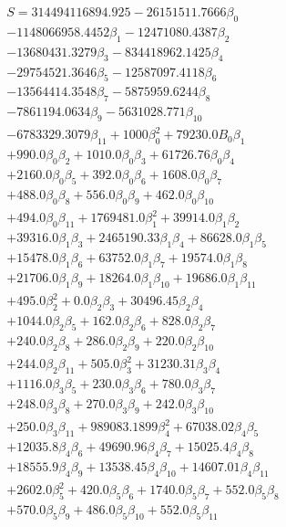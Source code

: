 \documentclass[letterpaper, 10 pt, conference]{ieeeconf}
\begin{document}
\begin{equation} \label{eq7}
\begin{split}
S = 314494116894.925-26151511.7666\beta_0\\
-1148066958.4452\beta_1-12471080.4387\beta_2\\
-13680431.3279\beta_3-834418962.1425\beta_4\\
-29754521.3646\beta_5-12587097.4118\beta_6\\
-13564414.3548\beta_7-5875959.6244\beta_8\\
-7861194.0634\beta_9-5631028.771\beta_{10}\\
-6783329.3079\beta_{11}+1000\beta_0^2+79230.0B_0\beta_1\\
+990.0\beta_0\beta_2+1010.0\beta_0\beta_3+61726.76\beta_0\beta_4\\
+2160.0\beta_0\beta_5+392.0\beta_0\beta_6+1608.0\beta_0\beta_7\\
+488.0\beta_0\beta_8+556.0\beta_0\beta_9+462.0\beta_0\beta_{10}\\
+494.0\beta_0\beta_{11}+1769481.0\beta_1^2+39914.0\beta_1\beta_2\\
+39316.0\beta_1\beta_3+2465190.33\beta_1\beta_4+86628.0\beta_1\beta_5\\
+15478.0\beta_1\beta_6+63752.0\beta_1\beta_7+19574.0\beta_1\beta_8\\
+21706.0\beta_1\beta_9+18264.0\beta_1\beta_{10}+19686.0\beta_1\beta_{11}\\
+495.0\beta_2^2+0.0\beta_2\beta_3+30496.45\beta_2\beta_4\\
+1044.0\beta_2\beta_5+162.0\beta_2\beta_6+828.0\beta_2\beta_7\\
+240.0\beta_2\beta_8+286.0\beta_2\beta_9+220.0\beta_2\beta_{10}\\
+244.0\beta_2\beta_{11}+505.0\beta_3^2+31230.31\beta_3\beta_4\\
+1116.0\beta_3\beta_5+230.0\beta_3\beta_6+780.0\beta_3\beta_7\\
+248.0\beta_3\beta_8+270.0\beta_3\beta_9+242.0\beta_3\beta_{10}\\
+250.0\beta_3\beta_{11}+989083.1899\beta_4^2+67038.02\beta_4\beta_5\\
+12035.8\beta_4\beta_6+49690.96\beta_4\beta_7+15025.4\beta_4\beta_8\\
+18555.9\beta_4\beta_9+13538.45\beta_4\beta_{10}+14607.01\beta_4\beta_{11}\\
+2602.0\beta_5^2+420.0\beta_5\beta_6+1740.0\beta_5\beta_7+552.0\beta_5\beta_8\\
+570.0\beta_5\beta_9+486.0\beta_5\beta_{10}+552.0\beta_5\beta_{11}\\

\end{split}
\end{equation}
\end{document}
